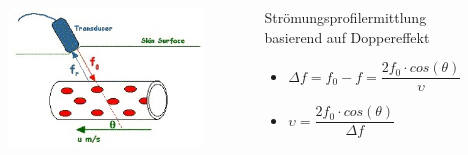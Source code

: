 \documentclass{beamer}
\begin{document}
%
%
%
%
%
\begin{frame}
\begin{columns}
		\begin{figure}[h]
			\includegraphics[width=1\textwidth]{pw/DopplerBloodFlow}
		\end{figure}
		\begin{block}{Strömungsprofilermittlung basierend auf Doppereffekt}
		\begin{itemize}
			\item $\Delta f= f_0-f= \dfrac{2f_0\cdot cos\left(\theta\right)}{\upsilon}$
			\item[\Checkmark] $\upsilon=\dfrac{2f_0\cdot cos\left(\theta\right)}{\Delta f}$
		\end{itemize}
		\end{block}
\end{columns}
\end{frame}
\end{document}

